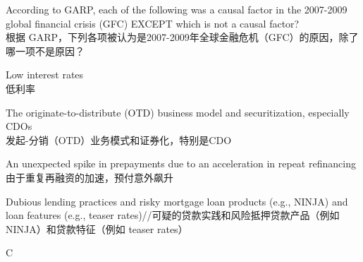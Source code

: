 \documentclass{article}
\newcounter{question} %
\begin{document}
 \begin{question}
    According to GARP, each of the following was a causal factor in the 2007-2009 global financial crisis (GFC) EXCEPT which is not a causal factor?\\
    根据 GARP，下列各项被认为是2007-2009年全球金融危机（GFC）的原因，除了哪一项不是原因？
    \end{question}
    
    \begin{choices}
        \item  Low interest rates\\低利率
        
        \item The originate-to-distribute (OTD) business model and securitization, especially CDOs\\发起-分销（OTD）业务模式和证券化，特别是CDO
        
        \item An unexpected spike in prepayments due to an acceleration in repeat refinancing\\由于重复再融资的加速，预付意外飙升

        
        \item Dubious lending practices and risky mortgage loan products (e.g., NINJA) and loan features (e.g., teaser rates)//可疑的贷款实践和风险抵押贷款产品（例如NINJA）和贷款特征（例如 teaser rates）
    \end{choices}
    
    \begin{correctanswer}
    C
    \end{correctanswer}
    
\end{document}
